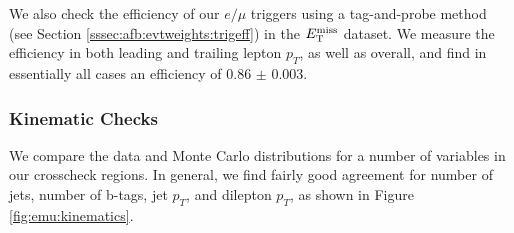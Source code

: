 We also check the efficiency of our $e/\mu$ triggers using a
tag-and-probe method (see Section \ref{sssec:afb:evtweights:trigeff})
in the $E_\text{T}^\text{miss}$ dataset. We measure the efficiency in both leading and
trailing lepton $p_T$, as well as overall, and find in essentially all
cases an efficiency of 0.86 $\pm$ 0.003.

\subsubsection{Kinematic Checks}
\label{sssec:emu:kinematics}

We compare the data and Monte Carlo distributions for a number of
variables in our crosscheck regions. In general, we find fairly good
agreement for number of jets, number of b-tags, jet $p_T$, and
dilepton $p_T$, as shown in Figure \ref{fig:emu:kinematics}.

